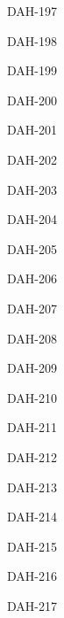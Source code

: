 \documentclass[]{article}
\begin{document}
\begin{center}
\begin{labels}
DAH-197


DAH-198


DAH-199


DAH-200


DAH-201


DAH-202


DAH-203


DAH-204


DAH-205


DAH-206


DAH-207


DAH-208


DAH-209


DAH-210


DAH-211


DAH-212


DAH-213


DAH-214


DAH-215


DAH-216


DAH-217


DAH-218


DAH-219


DAH-220


DAH-221


DAH-222


DAH-223


DAH-224


DAH-225


DAH-226


DAH-227


DAH-228


DAH-229


DAH-230


DAH-231


DAH-232


DAH-233


DAH-234


DAH-235


DAH-236


DAH-237


DAH-238


DAH-239


DAH-240


DAH-241


DAH-242


DAH-243


DAH-244


DAH-245


DAH-246


DAH-247


DAH-248



\end{labels}
\end{center}
\end{document}
